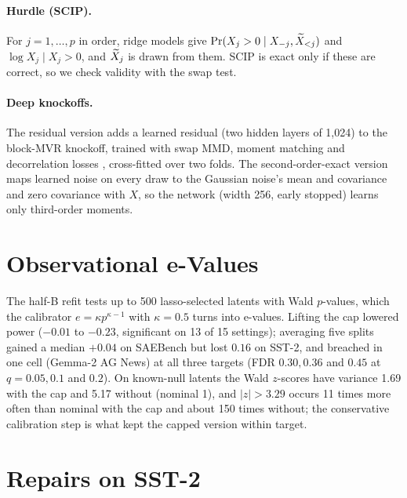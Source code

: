 \paragraph{Hurdle (SCIP).} For $j = 1, \dots, p$ in order, ridge models give $\Pr(X_j > 0 \mid X_{-j}, \widetilde{X}_{<j})$ and
$\log X_j \mid X_j > 0$, and $\widetilde{X}_j$ is drawn from them. SCIP is exact only if these are correct, so we check validity with the swap test.

\paragraph{Deep knockoffs.} The residual version adds a learned residual (two hidden layers of 1,024) to the block-MVR knockoff,
trained with swap MMD, moment matching and decorrelation losses \citep{romano2020deep}, cross-fitted over two folds. The
second-order-exact version maps learned noise on every draw to the Gaussian noise's mean and covariance and zero covariance with
$X$, so the network (width 256, early stopped) learns only third-order moments.

\section{Observational e-Values}
\label{app:evalue}

The half-B refit tests up to 500 lasso-selected latents with Wald $p$-values, which the calibrator
$e = \kappa p^{\kappa - 1}$ with $\kappa = 0.5$ turns into e-values. Lifting the cap lowered power ($-0.01$ to $-0.23$,
significant on 13 of 15 settings); averaging five splits gained a median $+0.04$ on SAEBench but lost $0.16$ on SST-2, and breached in one cell (Gemma-2 AG News) at all three targets (FDR $0.30, 0.36$ and $0.45$ at $q = 0.05, 0.1$ and $0.2$). On known-null latents the Wald $z$-scores have variance
1.69 with the cap and 5.17 without (nominal 1), and $|z| > 3.29$ occurs 11 times more often than nominal with the cap and about 150 times without; the
conservative calibration step is what kept the capped version within target.

\section{Repairs on SST-2}
\label{app:sst2repairs}

